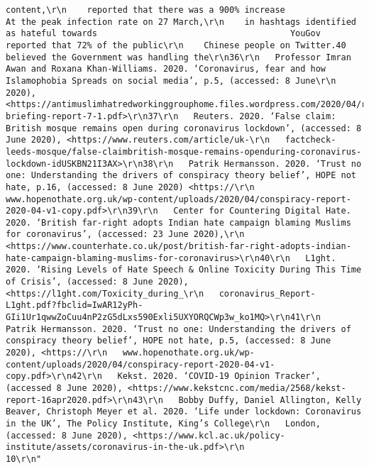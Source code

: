 \documentclass[
]{book}
\begin{document}
\begin{verbatim}
content,\r\n    reported that there was a 900% increase                                        At the peak infection rate on 27 March,\r\n    in hashtags identified as hateful towards                                      YouGov reported that 72% of the public\r\n    Chinese people on Twitter.40                                                   believed the Government was handling the\r\n36\r\n   Professor Imran Awan and Roxana Khan-Williams. 2020. ‘Coronavirus, fear and how Islamophobia Spreads on social media’, p.5, (accessed: 8 June\r\n   2020), <https://antimuslimhatredworkinggrouphome.files.wordpress.com/2020/04/research-briefing-report-7-1.pdf>\r\n37\r\n   Reuters. 2020. ‘False claim: British mosque remains open during coronavirus lockdown’, (accessed: 8 June 2020), <https://www.reuters.com/article/uk-\r\n   factcheck-leeds-mosque/false-claimbritish-mosque-remains-openduring-coronavirus-lockdown-idUSKBN21I3AX>\r\n38\r\n   Patrik Hermansson. 2020. ‘Trust no one: Understanding the drivers of conspiracy theory belief’, HOPE not hate, p.16, (accessed: 8 June 2020) <https://\r\n   www.hopenothate.org.uk/wp-content/uploads/2020/04/conspiracy-report-2020-04-v1-copy.pdf>\r\n39\r\n   Center for Countering Digital Hate. 2020. ‘British far-right adopts Indian hate campaign blaming Muslims for coronavirus’, (accessed: 23 June 2020),\r\n   <https://www.counterhate.co.uk/post/british-far-right-adopts-indian-hate-campaign-blaming-muslims-for-coronavirus>\r\n40\r\n   L1ght. 2020. ‘Rising Levels of Hate Speech & Online Toxicity During This Time of Crisis’, (accessed: 8 June 2020), <https://l1ght.com/Toxicity_during_\r\n   coronavirus_Report-L1ght.pdf?fbclid=IwAR12yPh-GIi1Ur1qwwZoCuu4nP2zG5dLxs590Exli5UXYORQCWp3w_ko1MQ>\r\n41\r\n   Patrik Hermansson. 2020. ‘Trust no one: Understanding the drivers of conspiracy theory belief’, HOPE not hate, p.5, (accessed: 8 June 2020), <https://\r\n   www.hopenothate.org.uk/wp-content/uploads/2020/04/conspiracy-report-2020-04-v1-copy.pdf>\r\n42\r\n   Kekst. 2020. ‘COVID-19 Opinion Tracker’, (accessed 8 June 2020), <https://www.kekstcnc.com/media/2568/kekst-report-16apr2020.pdf>\r\n43\r\n   Bobby Duffy, Daniel Allington, Kelly Beaver, Christoph Meyer et al. 2020. ‘Life under lockdown: Coronavirus in the UK’, The Policy Institute, King’s College\r\n   London, (accessed: 8 June 2020), <https://www.kcl.ac.uk/policy-institute/assets/coronavirus-in-the-uk.pdf>\r\n                                                                               10\r\n"                                                                                                                                                                                                 

\end{verbatim}
\end{document}
